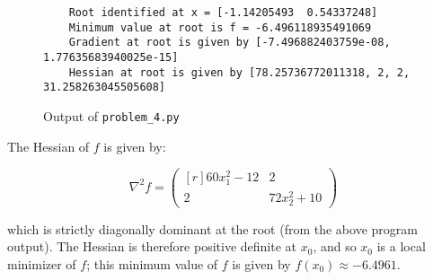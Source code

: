 \begin{solution}
\begin{figure}[h]
\begin{verbatim}
    Root identified at x = [-1.14205493  0.54337248]
    Minimum value at root is f = -6.496118935491069
    Gradient at root is given by [-7.496882403759e-08, 1.77635683940025e-15]
    Hessian at root is given by [78.25736772011318, 2, 2, 31.258263045505608]
        \end{verbatim}
        \caption{Output of \texttt{problem\_4.py}}
        \label{fig:problem_4}
    \end{figure}

    \pagebreak
    The Hessian of $f$ is given by:

    $$
    \nabla^2 f = \begin{pmatrix*}[r]
        60 x_1^2 - 12 & 2 \\
        2             & 72 x_2^2 + 10
    \end{pmatrix*}
    $$

    which is strictly diagonally dominant at the root (from the above program output). The Hessian is therefore positive
    definite at $x_0$, and so $x_0$ is a local minimizer of $f$; this minimum value of $f$ is given by 
    $f(x_0) \approx -6.4961$.
    \ \\
\end{solution}
